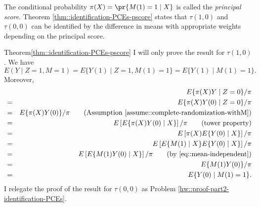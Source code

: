 The conditional probability $\pi(X) =  \pr\{ M(1)=1\mid X \} $ is called the {\it principal score}. Theorem \ref{thm::identification-PCEs-pscore} states that $\tau(1,0) $ and  $\tau(0,0)$ can be identified by the difference in means with appropriate weights depending on the principal score. 



 \begin{myproof}{Theorem}{\ref{thm::identification-PCEs-pscore}}
 I will only prove the result for $\tau(1,0) $. 
We have
 $$
 E(Y\mid Z=1, M=1)  = E\{ Y(1) \mid Z=1, M(1) = 1 \} =  E\{ Y(1) \mid   M(1) = 1 \} .
 $$
Moreover, 
 \begin{eqnarray*}
&& E  \{\pi(X) Y\mid Z=0   \}  /\pi  \\
 &=& E  \{\pi(X) Y(0)  \mid Z=0 \}  /\pi  \\
 &=&  E  \{\pi(X) Y(0)   \}  /\pi \qquad   (\text{Assumption } \ref{assume::complete-randomization-withM}) \\
 &=&  E \left[    E\{\pi(X) Y(0) \mid X  \} \right]/\pi  \qquad (\text{tower property}) \\ 
 &=& E \left[  \pi(X)  E\{ Y(0) \mid X  \} \right]/\pi  \\ 
 &=& E \left[  E\{    M(1) \mid X\} E\{ Y(0) \mid X  \} \right]/\pi \\
 &=&  E \left[  E\{    M(1)  Y(0) \mid X  \} \right]/\pi  \qquad  (\text{by } \eqref{eq::mean-independent}) \\
 &=&  E\{    M(1) Y(0)  \}/\pi   \\
 &=&  E\{ Y(0) \mid M(1) = 1 \}  .
 \end{eqnarray*}
% 
I relegate the proof of the result for $\tau(0,0) $ as Problem \ref{hw::proof-part2-identification-PCEs}. 
 \end{myproof}

